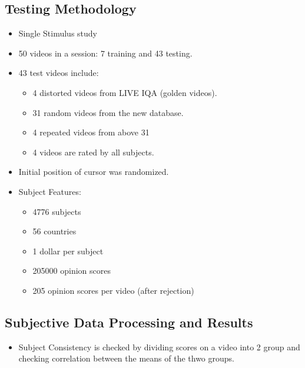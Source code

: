 \documentclass{article}
\begin{document}
    \subsection{Testing Methodology}\label{subsec:Large_Scale_Study_of_Perceptual_Video_Quality_(LIVE_VQC_Database):testing-methodology}
    \begin{itemize}
        \item Single Stimulus study
        \item 50 videos in a session: 7 training and 43 testing.
        \item 43 test videos include:
        \begin{itemize}
            \item 4 distorted videos from LIVE IQA (golden videos).
            \item 31 random videos from the new database.
            \item 4 repeated videos from above 31
            \item 4 videos are rated by all subjects.
        \end{itemize}
        \item Initial position of cursor was randomized.
        \item Subject Features:
        \begin{itemize}
            \item 4776 subjects
            \item 56 countries
            \item 1 dollar per subject
            \item 205000 opinion scores
            \item 205 opinion scores per video (after rejection)
        \end{itemize}
    \end{itemize}

    \subsection{Subjective Data Processing and Results}\label{subsec:Large_Scale_Study_of_Perceptual_Video_Quality_(LIVE_VQC_Database):processing}
    \begin{itemize}
        \item Subject Consistency is checked by dividing scores on a video into 2 group and checking correlation between the means of the thwo groups.
    \end{itemize}
\end{document}
